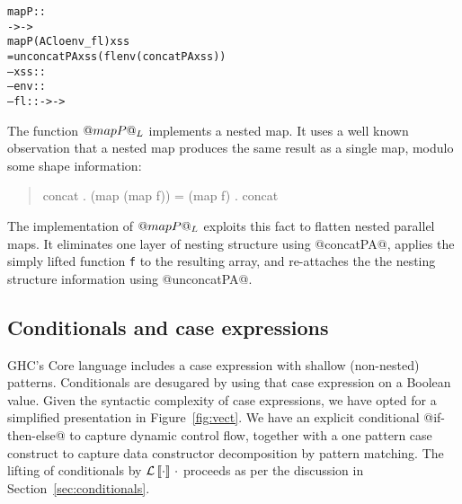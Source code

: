 \eject
\begin{alltt}
  mapP ::  
        ->  -> 
  mapP (AClo env _ fl) xss
    = unconcatPA xss (fl env (concatPA xss))
        -- xss :: 
        -- env :: 
        -- fl  ::  ->  -> 
\end{alltt}
%
The function $@mapP@_{\mathnormal{L}}$ implements a nested map. It uses a well known observation that a nested map produces the same result as a single map, modulo some shape information:
%
\begin{quote}
\begin{code}
concat . (map (map f)) = (map f) . concat
\end{code}
\end{quote}
%
The implementation of $@mapP@_{\mathnormal{L}}$ exploits this fact to flatten nested parallel maps. It eliminates one layer of nesting structure using @concatPA@, applies the simply lifted function \texttt{f} to the resulting array, and re-attaches the the nesting structure information using @unconcatPA@. 


\subsection{Conditionals and case expressions}

GHC's Core language includes a case expression with shallow (non-nested) patterns. Conditionals are desugared by using that case expression on a Boolean value. Given the syntactic complexity of case expressions, we have opted for a simplified presentation in Figure~\ref{fig:vect}. We have an explicit conditional @if-then-else@ to capture dynamic control flow, together with a one pattern case construct to capture data constructor decomposition by pattern matching. The lifting of conditionals by \(\mathcal{L}\left\llbracket \cdot \right\rrbracket\,\cdot\) proceeds as per the discussion in Section~\ref{sec:conditionals}. 
